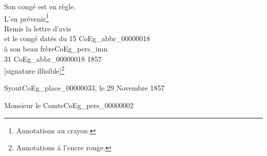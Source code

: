 \documentclass{book}
\begin{document}
\noindent Son congé est en règle.\\
L’en prévenir\footnote{Annotations au crayon.}\\


\noindent Remis la lettre d’avis\\
et le congé datés du 15 \gls{CoEg_abbr_00000018}\\
à son beau frère\gls{CoEg_pers_imn}\\
31 \gls{CoEg_abbr_00000018} 1857\\
{[signature illisible]}\footnote{Annotations à l'encre rouge.}\\
\begin{flushright}
Syout\gls{CoEg_place_00000033}, le 29 Novembre 1857
\end{flushright}

\hspace{1cm} Monsieur le Comte\gls{CoEg_pers_00000002}\\
\end{document}
